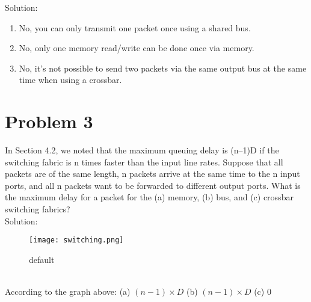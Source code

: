 \documentclass{article}
\begin{document}
\noindent Solution:\\

\begin{enumerate}
\item No, you can only transmit one packet once using a shared bus.\\
\item No, only one memory read/write can be done once via memory.\\
\item No, it's not possible to send two packets via the same output bus at the same time when using a crossbar.\\
\end{enumerate}


\newpage
\section{Problem 3} In Section 4.2, we noted that the maximum queuing delay is (n–1)D if the switching fabric is n times faster than the input line rates. Suppose that all packets are of the same length, n packets arrive at the same time to the n input ports, and all n packets want to be forwarded to different output ports. What is the maximum delay for a packet for the (a) memory, (b) bus, and (c) crossbar switching fabrics?\\



\noindent Solution:\\
\begin{figure}[htbp]
\begin{center}
\texttt{[image: switching.png]}
\caption{default}
\label{default}
\end{center}
\end{figure}
\\
According to the graph above:
(a) $(n-1)\times D$ (b) $(n-1)\times D$ (c) 0\\


\newpage
\end{document}
